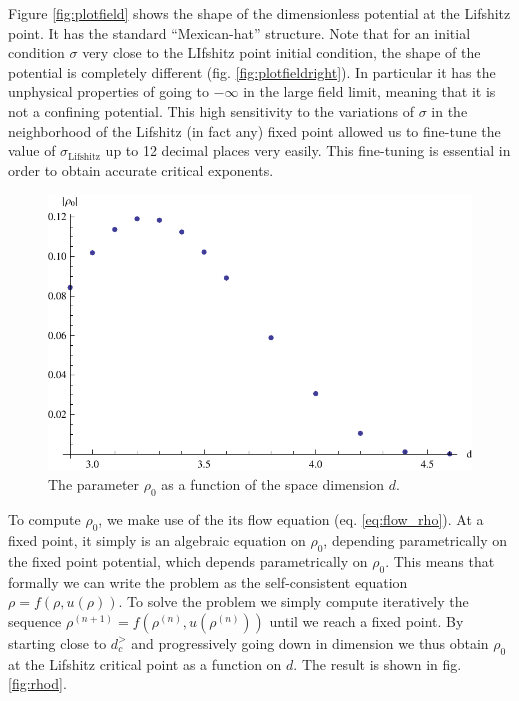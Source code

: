 Figure \eqref{fig:plotfield} shows the shape of the dimensionless potential at the Lifshitz point. It has the standard ``Mexican-hat'' structure. Note that for an initial condition $\sigma$ very close to the LIfshitz point initial condition, the shape of the potential is completely different (fig. \eqref{fig:plotfieldright}). In particular it has the unphysical properties of going to $-\infty$ in the large field limit, meaning that it is not a confining potential. This high sensitivity to the variations of $\sigma$ in the neighborhood of the Lifshitz (in fact any) fixed point allowed us to fine-tune the value of $\sigma_{\text{Lifshitz}}$ up to 12 decimal places very easily. This fine-tuning is essential in order to obtain accurate critical exponents.

\begin{figure}[htp]
\begin{center}
\includegraphics[scale=0.7]{img/chap4/rhod.pdf}
\caption{The parameter $\rho_0$ as a function of the space dimension $d$.}
\label{fig:rhod}
\end{center}
\end{figure}

To compute $\rho_0$, we make use of the its flow equation (eq. \eqref{eq:flow_rho}). At a fixed point, it simply is an algebraic equation on $\rho_0$, depending parametrically on the fixed point potential, which depends parametrically on $\rho_0$.  This means that formally we can write the problem as the self-consistent equation $\rho = f(\rho, u(\rho))$. To solve the problem we simply compute iteratively the sequence $\rho^{(n+1)} = f(\rho^{(n)}, u(\rho^{(n)}))$ until we reach a fixed point. By starting close to $d_c^>$ and progressively going down in dimension we thus obtain $\rho_0$ at the Lifshitz critical point as a function on $d$. The result is shown in fig. \eqref{fig:rhod}. 


